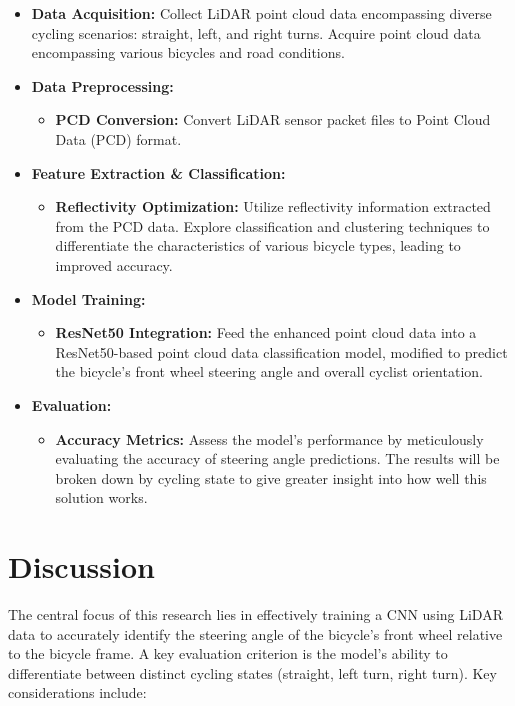 \documentclass{article}
\begin{document}
\begin{itemize}
    \item \textbf{Data Acquisition:} Collect LiDAR point cloud data encompassing diverse cycling scenarios: straight, left, and right turns. Acquire point cloud data encompassing various bicycles and road conditions.
    \item \textbf{Data Preprocessing:}
    \begin{itemize}
        \item \textbf{PCD Conversion:} Convert LiDAR sensor packet files to Point Cloud Data (PCD) format.
    \end{itemize}
    \item \textbf{Feature Extraction \& Classification:}
    \begin{itemize}
        \item \textbf{Reflectivity Optimization:} Utilize reflectivity information extracted from the PCD data. Explore classification and clustering techniques to differentiate the characteristics of various bicycle types, leading to improved accuracy.
    \end{itemize}
    \item \textbf{Model Training:}
    \begin{itemize}
        \item \textbf{ResNet50 Integration:} Feed the enhanced point cloud data into a ResNet50-based point cloud data classification model, modified to predict the bicycle's front wheel steering angle and overall cyclist orientation.
    \end{itemize}
    \item \textbf{Evaluation:}
    \begin{itemize}
        \item \textbf{Accuracy Metrics:}  Assess the model's performance by meticulously evaluating the accuracy of steering angle predictions. The results will be broken down by cycling state to give greater insight into how well this solution works.
    \end{itemize}
\end{itemize}

\section{Discussion}

The central focus of this research lies in effectively training a CNN using LiDAR data to accurately identify the steering angle of the bicycle's front wheel relative to the bicycle frame. A key evaluation criterion is the model's ability to differentiate between distinct cycling states (straight, left turn, right turn). Key considerations include:
\end{document}
